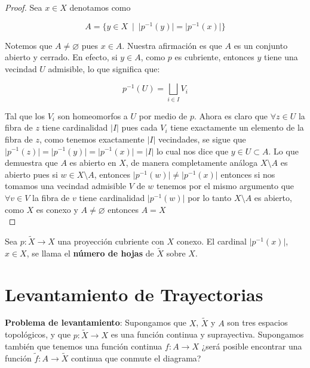\begin{proof}
Sea $x \in X$ denotamos como 

$$A=\lbrace y \in X \: \mid \: \vert p^{-1}(y) \vert= \vert p^{-1}(x)\vert \rbrace$$

Notemos que $A \neq \varnothing$ pues $x \in A$. Nuestra  afirmaci\'on es que $A$ es un conjunto abierto y cerrado. En efecto, si $y \in A$, como $p$ es cubriente, entonces $y$ tiene una vecindad $U$ admisible, lo que significa que: 

$$p^{-1}(U)=\bigsqcup_{i \in I}V_i$$ 

Tal que los $V_i$ son homeomorfos a $U$ por medio de $p$. Ahora es claro que $\forall z \in U$ la fibra de $z$ tiene cardinalidad $\vert I \vert$ pues cada $V_i$ tiene exactamente un elemento de la fibra de $z$, como tenemos exactamente $\vert I \vert$ vecindades, se sigue que $\vert p^{-1}(z) \vert = \vert p^{-1}(y) \vert = \vert p^{-1}(x) \vert =\vert I \vert$ lo cual nos dice que $y \in U \subset A$. Lo que demuestra que $A$ es abierto en $X$, de manera completamente an\'aloga $X \setminus A$ es abierto pues si $w \in X \setminus A$, entonces $\vert p^{-1}(w) \vert \neq \vert p^{-1}(x) \vert$ entonces si nos tomamos una vecindad admisible $V$ de $w$ tenemos por el mismo argumento que $\forall v \in V$ la fibra de $v$ tiene cardinalidad $\vert p^{-1}(w) \vert$ por lo tanto $X \setminus A$ es abierto, como $X$ es conexo y $A \neq \varnothing$ entonces $A=X$\\  

\end{proof}

\begin{definition}
Sea $p: \widetilde{X} \rightarrow X$ una proyecci\'on cubriente con $X$ conexo. El cardinal $\vert p^{-1}(x) \vert$, $x \in X$, se llama el \textbf{n\'umero de hojas} de $\widetilde{X}$ sobre $X$.\\

\end{definition}


\section{Levantamiento de Trayectorias}

\textbf{Problema de levantamiento}: Supongamos que $X$, $\widetilde{X}$ y $A$ son tres espacios topol\'ogicos, y que $p: \widetilde{X} \rightarrow X$ es una funci\'on continua y suprayectiva. Supongamos tambi\'en que tenemos una funci\'on continua $f: A \rightarrow X$ ¿ser\'a posible encontrar una funci\'on $\widetilde{f} : A  \rightarrow \widetilde{X}$ continua que conmute el diagrama? 


